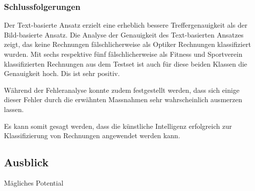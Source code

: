 \subsubsection{Schlussfolgerungen}

Der Text-basierte Ansatz erzielt eine erheblich bessere Treffergenauigkeit als der Bild-basierte Ansatz. Die Analyse der Genauigkeit des Text-basierten Ansatzes zeigt, das keine Rechnungen fälschlicherweise als Optiker Rechnungen klassifiziert wurden. Mit sechs respektive fünf fälschlicherweise als Fitness und Sportverein klassifizierten Rechnungen aus dem Testset ist auch für diese beiden Klassen die Genauigkeit hoch. Dis ist sehr positiv.

Während der Fehleranalyse konnte zudem festgestellt werden, dass sich einige dieser Fehler durch die erwähnten Massnahmen sehr wahrscheinlich ausmerzen lassen.

Es kann somit gesagt werden, dass die künstliche Intelligenz erfolgreich zur Klassifizierung von Rechnungen angewendet werden kann.


\subsection{Ausblick}

Mägliches Potential